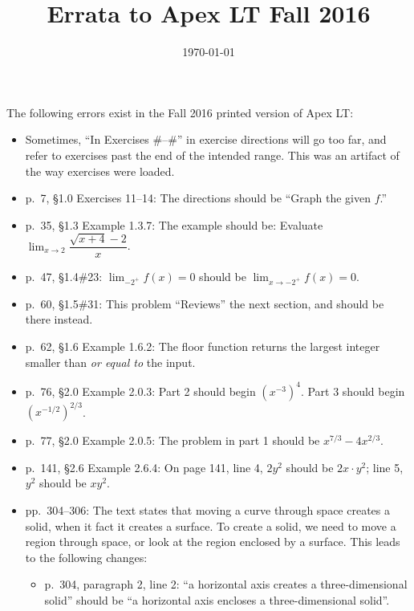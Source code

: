 \documentclass{amsart}
\title{Errata to Apex LT Fall 2016}
\date{\today}
\newif\ifinstructor
\newcommand{\ds}{\displaystyle}
\begin{document}
\maketitle

The following errors exist in the Fall 2016 printed version of Apex LT:
\begin{itemize}
\item Sometimes, ``In Exercises \#--\#'' in exercise directions will go too far, and refer to exercises past the end of the intended range.  This was an artifact of the way exercises were loaded.
\item p.\ 7, \S1.0 Exercises 11--14: The directions should be ``Graph the given $f$.''
\item p.\ 35, \S1.3 Example 1.3.7: The example should be: Evaluate $\ds\lim_{x\to 2}\dfrac{\sqrt{x+4}-2}x$.
\ifinstructor
\item p.\ 39, \S1.3\#33: The answer should be $1/6$.
\item p.\ 47, \S1.4\#13: The answer to parts b and d should be 0.
\fi
\item p.\ 47, \S1.4\#23: $\ds\lim_{-2^+}f(x)=0$ should be $\ds\lim_{x\to-2^+}f(x)=0$.
\item p.\ 60, \S1.5\#31: This problem ``Reviews'' the next section, and should be there instead.
\item p.\ 62, \S1.6 Example 1.6.2: The floor function returns the largest integer smaller than \emph{or equal to} the input.
\ifinstructor
\item p.\ 72, \S1.6\#41: The given answer of $a=1$, $b=-1$ is not continuous at $x=-1$.  The correct answer is $a=\frac34$, $b=-\frac14$.
\fi
\item p.\ 76, \S2.0 Example 2.0.3: Part 2 should begin $(x^{-3})^4$.  Part 3 should begin $(x^{-1/2})^{2/3}$.
\item p.\ 77, \S2.0 Example 2.0.5: The problem in part 1 should be $x^{7/3}-4x^{2/3}$.
\item p.\ 141, \S2.6 Example 2.6.4: On page 141, line 4, $2y^2$ should be $2x\cdot y^2$; line 5, $y^2$ should be $xy^2$.
\item pp.\ 304--306: The text states that moving a curve through space creates a solid, when it fact it creates a surface.  To create a solid, we need to move a region through space, or look at the region enclosed by a surface.  This leads to the following changes:
\begin{itemize}
\item p.\ 304, paragraph 2, line 2: ``a horizontal axis creates a three-dimensional solid'' should be ``a horizontal axis encloses a three-dimensional solid''.

\end{itemize}
\end{itemize}
\end{document}
